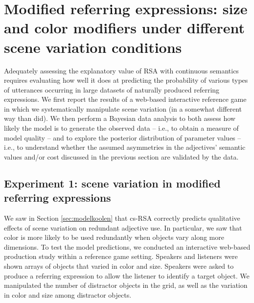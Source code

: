 \documentclass[11pt]{article}
\newcommand{\appref}[1]{Appendix \ref{#1}}
\newcommand{\sectionref}[1]{Section \ref{#1}}
\begin{document}
\section[]{Modified referring expressions: size and color modifiers under different scene variation conditions}
\label{sec:rsaevaluationbasicscene}

Adequately assessing the explanatory value of RSA with continuous semantics requires evaluating how well it does at predicting the probability of various types of utterances occurring in large datasets of naturally produced referring expressions. We first report the results of a web-based interactive reference game in which we systematically manipulate scene variation (in a somewhat different way than  did). 
We then perform a Bayesian data analysis to both assess  how likely the model is to generate the observed data -- i.e., to obtain a measure of model quality -- and to explore the posterior distribution of parameter values -- i.e., to understand whether the assumed asymmetries in the adjectives' semantic values and/or cost discussed in the previous section are validated by the data.


\subsection{Experiment 1: scene variation in modified referring expressions}
\label{sec:exp1-scenevar}

We saw in \sectionref{sec:modelkoolen} that cs-RSA correctly predicts qualitative effects of scene variation on redundant adjective use. In particular, we saw that color is more likely to be used redundantly when objects vary along more dimensions. 
To test the model predictions, we conducted an interactive web-based production study within a reference game setting. %
Speakers and listeners were shown arrays of objects that varied in color and size. Speakers were asked to produce a referring expression to allow the listener to identify a target object. We manipulated the number of distractor objects in the grid, as well as the variation in color and size among distractor objects.
\end{document}
